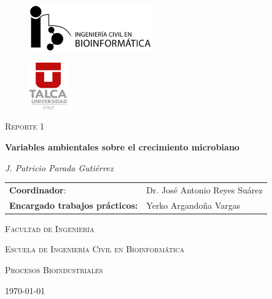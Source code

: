 \documentclass[a4paper,12pt]{article}
\begin{document}
  \begin{titlepage}
    \centering
    \toprule
    \vspace{1cm}
    \begin{minipage}[b]{.45\linewidth}
      \begin{figure}[H]
        \raggedright
        \includegraphics[height=2.0cm]{icb_logo}
      \end{figure}
    \end{minipage}
    \begin{minipage}[b]{.45\linewidth}
      \begin{figure}[H]
        \raggedleft
        \includegraphics[height=2.0cm]{utalca_logo}
      \end{figure}
    \end{minipage}

    \vspace{2cm}

    {\large \scshape Reporte 1 \par}
    \vspace{1cm}
    {\Large \bfseries Variables ambientales sobre el crecimiento microbiano \par}
    \vspace{2cm}
    {\itshape J. Patricio Parada Gutiérrez \par}
    \vspace{2cm}

    \begin{tabular}{ll}
      \textbf{Coordinador}: & Dr. José Antonio Reyes Suárez \\
      \textbf{Encargado trabajos prácticos:} & Yerko Argandoña Vargas \\
    \end{tabular}

    \vfill
    {\scshape Facultad de Ingeniería \par}
    {\scshape Escuela de Ingeniería Civil en Bioinformática \par}
    {\scshape Procesos Bioindustriales \par}

    \vfill
    {\scshape \today \par}

    \vfill
    \bottomrule
  \end{titlepage}
\end{document}
